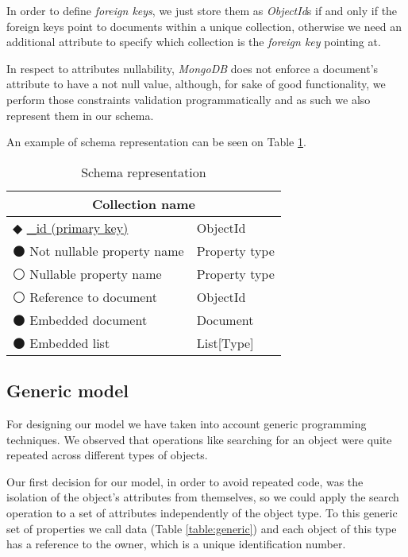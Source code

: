     In order to define \emph{foreign keys}, we just store them as \emph{ObjectId}s if and only if the foreign keys point to documents within a unique collection, otherwise we need an additional attribute to specify which collection is the \emph{foreign key} pointing at.

    In respect to attributes nullability, \emph{MongoDB} does not enforce a document's attribute to have a not null value, although, for sake of good functionality, we perform those constraints validation programmatically and as such we also represent them in our schema.
    
    An example of schema representation can be seen on Table \ref{table:schema}.

\begin{table}
\centering
\caption{Schema representation}
\label{table:schema}
    \begin{tabular}{|ll|}
        \hline
        \multicolumn{2}{|c|}{\textbf{Collection name}}            \\ \hline
        $\Diamondblack$ \underline{\_id (primary key)} & ObjectId \\ 
        $\medbullet$ Not nullable property name & Property type   \\ 
        $\medcirc$ Nullable property name       & Property type   \\
        $\medcirc$ Reference to document        & ObjectId        \\
        $\medbullet$ Embedded document          & Document        \\ 
        $\medbullet$ Embedded list              & List[Type]      \\ \hline
    \end{tabular}
\end{table}

\subsection {Generic model}

For designing our model we have taken into account generic programming techniques. We observed that operations like searching for an object were quite repeated across different types of objects. 

Our first decision for our model, in order to avoid repeated code, was the isolation of the object's attributes from themselves, so we could apply the search operation to a set of attributes independently of the object type. To this generic set of properties we call data (Table \ref{table:generic}) and each object of this type has a reference to the owner, which is a unique identification number.

